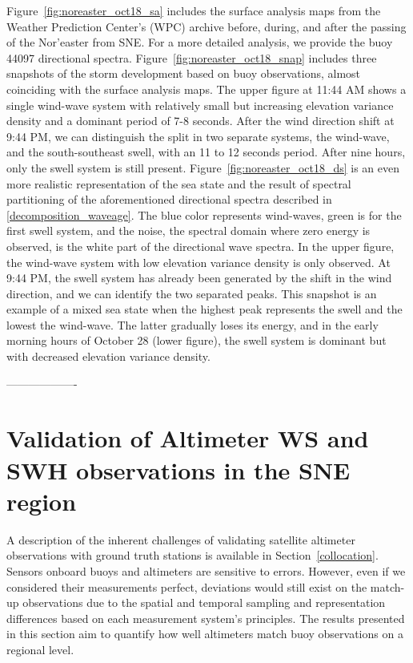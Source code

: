 Figure~\ref{fig:noreaster_oct18_sa} includes the surface analysis maps from the Weather Prediction Center's (WPC) archive before, during, and after the passing of the Nor'easter from SNE. For a more detailed analysis, we provide the buoy 44097 directional spectra. Figure~\ref{fig:noreaster_oct18_snap} includes three snapshots of the storm development based on buoy observations, almost coinciding with the surface analysis maps. The upper figure at 11:44 AM shows a single wind-wave system with relatively small but increasing elevation variance density and a dominant period of 7-8 seconds. After the wind direction shift at 9:44 PM,  we can distinguish the split in two separate systems, the wind-wave, and the south-southeast swell, with an 11 to 12 seconds period. After nine hours, only the swell system is still present. Figure~\ref{fig:noreaster_oct18_ds} is an even more realistic representation of the sea state and the result of spectral partitioning of the aforementioned directional spectra described in \ref{decomposition_waveage}. The blue color represents wind-waves, green is for the first swell system, and the noise, the spectral domain where zero energy is observed, is the white part of the directional wave spectra. In the upper figure, the wind-wave system with low elevation variance density is only observed. At 9:44 PM, the swell system has already been generated by the shift in the wind direction, and we can identify the two separated peaks. This snapshot is an example of a mixed sea state when the highest peak represents the swell and the lowest the wind-wave. The latter gradually loses its energy, and in the early morning hours of October 28 (lower figure), the swell system is dominant but with decreased elevation variance density.


\pagebreak

-------------------


\section{Validation of Altimeter WS and SWH observations in the SNE region}\label{validation_SNE}


A description of the inherent challenges of validating satellite altimeter observations with ground truth stations is available in Section~\ref{collocation}. Sensors onboard buoys and altimeters are sensitive to errors. However, even if we considered their measurements perfect, deviations would still exist on the match-up observations due to the spatial and temporal sampling and representation differences based on each measurement system's principles. The results presented in this section aim to quantify how well altimeters match buoy observations on a regional level. 


